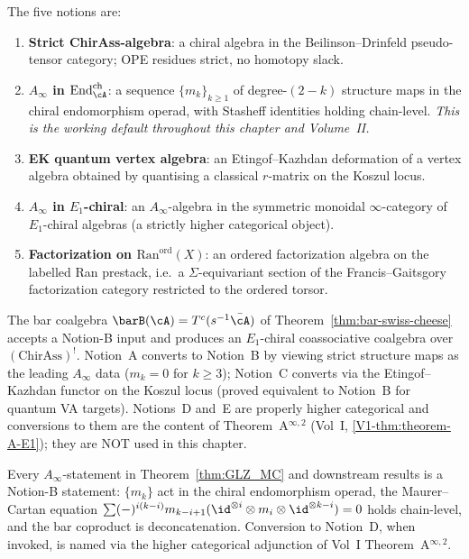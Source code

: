 \begin{convention}
\label{conv:bar-cobar-five-notions-default}
The five notions are:
\begin{enumerate}[label=\textup{(\Alph*)}]
\item \textbf{Strict ChirAss-algebra}: a chiral algebra in
the Beilinson--Drinfeld pseudo-tensor category; OPE residues
strict, no homotopy slack.
\item \textbf{$A_\infty$ in $\mathrm{End}^{\mathrm{ch}}_\cA$}: a
sequence $\{m_k\}_{k\ge 1}$ of degree-$(2-k)$ structure maps in
the chiral endomorphism operad, with Stasheff identities
holding chain-level. \emph{This is the working default
throughout this chapter and Volume~II.}
\item \textbf{EK quantum vertex algebra}: an Etingof--Kazhdan
deformation of a vertex algebra obtained by quantising a
classical $r$-matrix on the Koszul locus.
\item \textbf{$A_\infty$ in $E_1$-chiral}: an $A_\infty$-algebra
in the symmetric monoidal $\infty$-category of $E_1$-chiral
algebras (a strictly higher categorical object).
\item \textbf{Factorization on $\mathrm{Ran}^{\mathrm{ord}}(X)$}:
an ordered factorization algebra on the labelled Ran prestack,
i.e.\ a $\Sigma$-equivariant section of the Francis--Gaitsgory
factorization category restricted to the ordered torsor.
\end{enumerate}
The bar coalgebra $\barB(\cA) = T^c(s^{-1}\bar\cA)$ of
Theorem~\ref{thm:bar-swiss-cheese} accepts a Notion-B input
and produces an $E_1$-chiral coassociative coalgebra over
$(\mathrm{ChirAss})^!$. Notion~A converts to Notion~B by
viewing strict structure maps as the leading $A_\infty$ data
($m_k=0$ for $k\ge 3$); Notion~C converts via the Etingof--Kazhdan
functor on the Koszul locus (proved equivalent to Notion~B for
quantum VA targets). Notions~D and~E are properly higher
categorical and conversions to them are the content of
Theorem~A$^{\infty,2}$ (Vol~I, \cref{V1-thm:theorem-A-E1}); they
are NOT used in this chapter.
\end{convention}

\begin{remark}
\label{rem:bar-cobar-notion-conversion-operational}
Every $A_\infty$-statement in
Theorem~\ref{thm:GLZ_MC} and downstream results is a Notion-B
statement: $\{m_k\}$ act in the chiral endomorphism operad, the
Maurer--Cartan equation
$\sum (-)^{i(k-i)} m_{k-i+1}(\id^{\otimes i}\otimes m_i\otimes
\id^{\otimes k-i}) = 0$
holds chain-level, and the bar coproduct is deconcatenation.
Conversion to Notion~D, when invoked, is named via the higher
categorical adjunction of Vol~I Theorem~A$^{\infty,2}$.
\end{remark}

